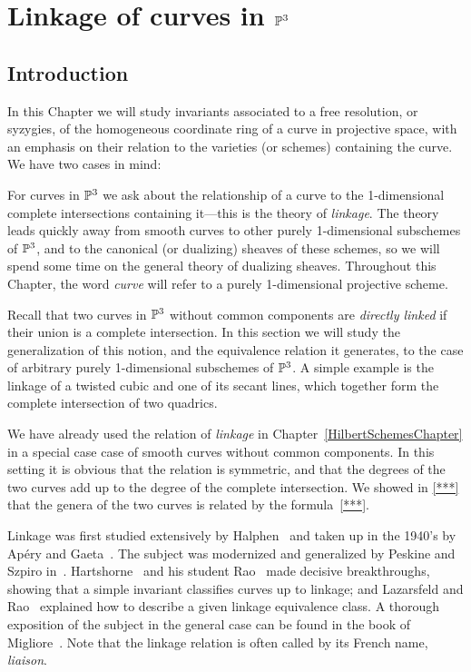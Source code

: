 

\chapter{Linkage of curves in ${\mathbb P}^3$}
\label{DualityChapter}\label{LinkageChapter}

\def\length{{\rm length}}
\def\red{{\rm red}}
\section{Introduction} 
In this Chapter we will study  invariants associated to a free resolution, or syzygies, of the homogeneous coordinate ring of a curve in projective space, with an emphasis on their relation to the varieties (or schemes) containing the curve. We have two cases in mind:

For curves in ${\mathbb P}^{3}$ we ask about the relationship of a curve to the 1-dimensional complete intersections containing it---this is the theory of \emph{linkage}. The theory leads quickly away from smooth curves to other purely 1-dimensional subschemes of ${\mathbb P}^{3}$, and to the canonical (or dualizing) sheaves of these schemes, so we will spend some time on the general theory of dualizing sheaves.
Throughout this Chapter, the word \emph{curve} will refer to a purely 1-dimensional projective scheme.

Recall that two curves in ${\mathbb P}^3$ without common components are \emph{directly linked} if their union is a complete intersection. In this section we will study the generalization of this notion, and the equivalence relation it generates, to the case of arbitrary purely 1-dimensional subschemes of ${\mathbb P}^3$. A simple example is the linkage of a twisted cubic and one of its secant lines, which together form the complete intersection of two quadrics.

We have already used the relation of \emph{ linkage} in Chapter~\ref{HilbertSchemesChapter}  in a special case case of smooth curves without common components. In this setting it is obvious that the relation is symmetric, and that the degrees of the two curves add up to the degree of the complete intersection. We showed in \ref{***} that the genera of the two curves is related by the formula~\ref{***}. 

Linkage was first studied extensively by Halphen~\cite{***} and taken up in the 1940's by Ap\'ery and Gaeta~\cite{****}. The subject was modernized and generalized by Peskine and Szpiro in~\cite{PeskineSzpiro}. Hartshorne~\cite{****} and his student
Rao~\cite{****} made decisive breakthroughs, showing that a simple invariant classifies curves up to linkage; and Lazarsfeld and Rao~\cite{****} explained how to describe a given linkage equivalence class. A thorough exposition of the subject in the general case can be found in the book of Migliore~\cite{Mig}. Note that the linkage relation is often called by its French name, \emph{liaison}.

